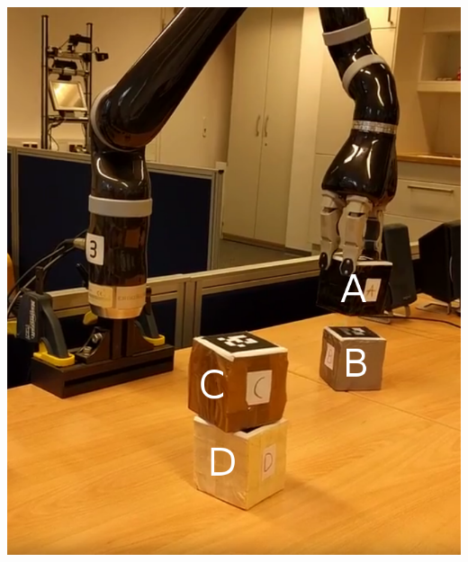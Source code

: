 \begin{frame}
\begin{columns}
\begin{column}{0.4\textwidth}
    \includegraphics[width=\textwidth]{../thesis/img/blocks-world-annotated}
    \end{column}
  \end{columns}
\end{frame}

